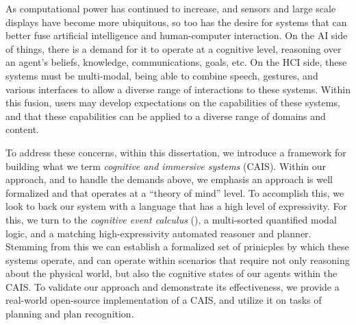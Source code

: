  

As computational power has continued to increase, and sensors and large
scale displays have become more ubiquitous, so too has the desire for
systems that can better fuse artificial intelligence and human-computer
interaction. On the AI side of things, there is a demand for it to
operate at a cognitive level, reasoning over an agent's beliefs,
knowledge, communications, goals, etc. On the HCI side, these systems
must be multi-modal, being able to combine speech, gestures,
and various interfaces to allow a diverse range of interactions to
these systems. Within this fusion, users may develop expectations on
the capabilities of these systems, and that these capabilities can
be applied to a diverse range of domains and content.

To address these concerns, within this dissertation, we introduce a
framework for building what we term \textit{cognitive and immersive systems}
(CAIS). Within our approach, and to handle the demands above, we
emphasis an approach is well formalized and that operates at a
``theory of mind'' level. To accomplish this, we look to back our
system with a language that has a high level of expressivity. For this,
we turn to the \textit{cognitive event calculus} (\CEC), a multi-sorted
quantified modal logic, and a matching high-expressivity automated
reasoner and planner. Stemming from this we can establish a formalized
set of prinicples by which these systems operate, and can operate
within scenarios that require not only reasoning about the physical world,
but also the cognitive states of our agents within the CAIS. To validate
our approach and demonstrate its effectiveness, we provide a real-world
open-source implementation of a CAIS, and utilize it on tasks of
planning and plan recognition.